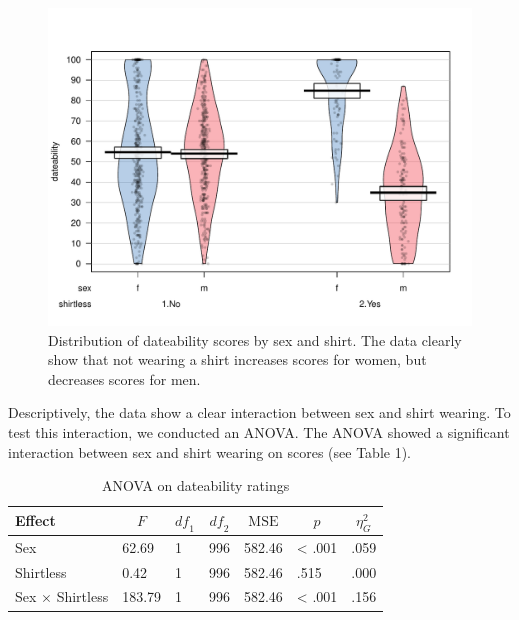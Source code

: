 \documentclass[english,floatsintext,man]{apa6}
\theoremstyle{definition}
\theoremstyle{definition}
\theoremstyle{remark}
\begin{document}
\begin{figure}[htbp]
\centering
\includegraphics{02-papaja-example-article-nathaniel-phillips_files/figure-latex/unnamed-chunk-4-1.pdf}
\caption{\label{fig:unnamed-chunk-4}Distribution of dateability scores by
sex and shirt. The data clearly show that not wearing a shirt increases
scores for women, but decreases scores for men.}
\end{figure}

Descriptively, the data show a clear interaction between sex and shirt
wearing. To test this interaction, we conducted an ANOVA. The ANOVA
showed a significant interaction between sex and shirt wearing on scores
(see Table 1).

\begin{table}[tbp]
\begin{center}
\begin{threeparttable}
\caption{\label{tab:unnamed-chunk-5}ANOVA on dateability ratings}
\begin{tabular}{lllllll}
\toprule
Effect & \multicolumn{1}{c}{$F$} & \multicolumn{1}{c}{$\mathit{df}_1$} & \multicolumn{1}{c}{$\mathit{df}_2$} & \multicolumn{1}{c}{$\mathrm{MSE}$} & \multicolumn{1}{c}{$p$} & \multicolumn{1}{c}{$\eta^2_G$}\\
\midrule
Sex & 62.69 & 1 & 996 & 582.46 & < .001 & .059\\
Shirtless & 0.42 & 1 & 996 & 582.46 & .515 & .000\\
Sex $\times$ Shirtless & 183.79 & 1 & 996 & 582.46 & < .001 & .156\\
\bottomrule
\end{tabular}
\end{threeparttable}
\end{center}
\end{table}
\end{document}
